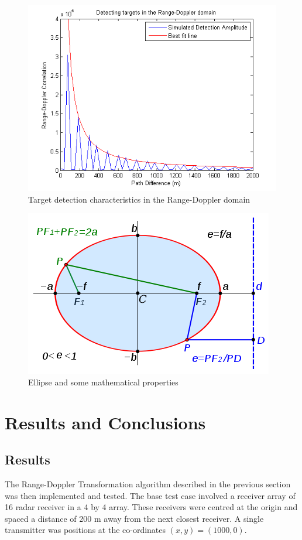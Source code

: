 \documentclass[12pt,openany,a4paper]{book}
\begin{document}
\begin{figure}[p]
\centering
\includegraphics{detect.png}
\caption{Target detection characteristics in the Range-Doppler domain}
\label{fig:detect}
\end{figure}

\begin{figure}[p]
\centering
\includegraphics{ell1.png}
\caption{Ellipse and some mathematical properties \cite{ellPic}}
\label{fig:ell1}
\end{figure}

\cleardoublepage

\chapter{Results and Conclusions}

\section{Results}
\label{sec:res}
The Range-Doppler Transformation algorithm described in the previous section was then implemented and tested. The base test case involved a receiver array of 16 radar receiver in a 4 by 4 array. These receivers were centred at the origin and spaced a distance of 200 m away from the next closest receiver. A single transmitter was positions at the co-ordinates $(x,y) = (1000,0)$. 
\end{document}
